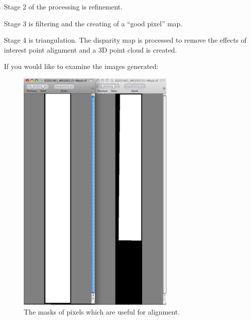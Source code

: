Stage 2 of the processing is refinement. 

Stage 3 is filtering and the creating of a ``good pixel'' map. 

Stage 4 is triangulation. The disparity map is processed to remove
the effects of interest point alignment and a 3D point cloud is
created.

If you would like to examine the images generated:

\begin{figure}
\begin{center}
\includegraphics[width=3in]{images/p19-masks.png}
\caption[P19 images masks]{
    \label{p19-masks}
	The masks of pixels which are useful for alignment.
    }
\end{center}
\end{figure}

